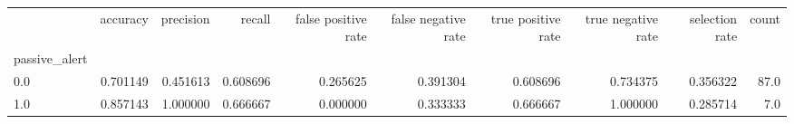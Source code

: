 \begin{tabular}{lrrrrrrrrr}
\toprule
{} &  accuracy &  precision &    recall &  false positive rate &  false negative rate &  true positive rate &  true negative rate &  selection rate &  count \\
passive\_alert &           &            &           &                      &                      &                     &                     &                 &        \\
\midrule
0.0           &  0.701149 &   0.451613 &  0.608696 &             0.265625 &             0.391304 &            0.608696 &            0.734375 &        0.356322 &   87.0 \\
1.0           &  0.857143 &   1.000000 &  0.666667 &             0.000000 &             0.333333 &            0.666667 &            1.000000 &        0.285714 &    7.0 \\
\bottomrule
\end{tabular}
